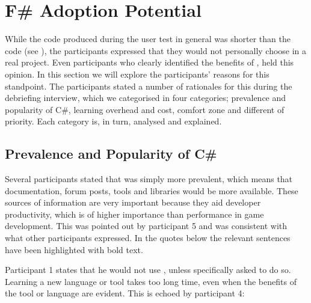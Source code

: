 \section{F\# Adoption Potential}\label{sec:adoption}\label{sec:test-conc}
While the \fs code produced during the user test in general was shorter than the \cs code (see ), the participants expressed that they would not personally choose \fs in a real project. Even participants who clearly identified the benefits of \fs, held this opinion. In this section we will explore the participants' reasons for this standpoint. The participants stated a number of rationales for this during the debriefing interview, which we categorised in four categories; prevalence and popularity of C\#, learning overhead and cost, comfort zone and different of priority. Each category is, in turn, analysed and explained.

\subsection{Prevalence and Popularity of C\#}
Several participants stated that \cs was simply more prevalent, which means that documentation, forum posts, tools and libraries would be more available. These sources of information are very important because they aid developer productivity, which is of higher importance than performance in game development. This was pointed out by participant 5 and was consistent with what other participants expressed. In the quotes below the relevant sentences have been highlighted with bold text.


Participant 1 states that he would not use \fs, unless specifically asked to do so. Learning a new language or tool takes too long time, even when the benefits of the tool or language are evident. This is echoed by participant 4:


